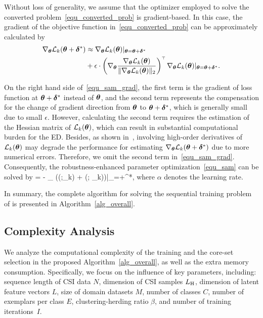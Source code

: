 Without loss of generality, we assume that the optimizer employed to solve the converted problem~\eqref{equ_converted_prob} is gradient-based.
In this case, the gradient of the objective function in~\eqref{equ_converted_prob} can be approximately calculated by
\begin{align}
    \label{equ_sam_grad}
    \nabla_{\bm\theta} \mathcal{L}_k(\bm\theta+\bm\delta^*) &\approx  \nabla_{\bm\theta} \mathcal{L}_k(\bm\theta)|_{\bm\theta = \bm\theta+\bm\delta^*}\\ 
    & + \epsilon \cdot \left( \nabla_{\bm\theta}\frac{ \nabla_{\bm\theta} \mathcal{L}_k(\bm\theta) }{\|\nabla_{\bm\theta} \mathcal{L}_k(\bm\theta)\|_2}\right)^{\scriptscriptstyle\top}\nabla_{\bm\theta} \mathcal{L}_k(\bm\theta)|_{\bm\theta = \bm\theta+\bm\delta^*}. \nonumber 
\end{align}

On the right hand side of~\eqref{equ_sam_grad}, the first term is the gradient of loss function at $\bm\theta+\bm\delta^*$ instead of $\bm\theta$, and the second term represents the compensation for the change of gradient direction from $\bm\theta$ to $\bm\theta+\bm\delta^*$, which is generally small due to small $\epsilon$. 
However, calculating the second term requires the estimation of the Hessian matrix of $\mathcal{L}_k(\bm\theta)$, which can result in substantial computational burden for the ED.
Besides, as shown in~\cite{Foret20ICLR_Sharpness}, involving high-order derivatives of $\mathcal{L}_k(\bm\theta)$ may degrade the performance for estimating $\nabla_{\bm\theta} \mathcal{L}_k(\bm\theta+\bm\delta^*)$ due to more numerical errors.
Therefore, we omit the second term in~\eqref{equ_sam_grad}.
Consequently, the robustness-enhanced parameter optimization~\eqref{equ_sam} can be solved by
\beq
\label{equ_param_update}
\btheta = \btheta - \alpha \nabla_{\btheta} (\cC(\btheta;\cD_k) + \cR(\btheta; \cK_k))|_{\btheta=\btheta+\bdelta^*},
\eeq
where $\alpha$ denotes the learning rate.

In summary, the complete algorithm for solving the sequential training problem of \name is presented in Algorithm~\ref{alg_overall}.




\subsection{Complexity Analysis}\label{s2ec_complex_ana}
We analyze the computational complexity of the training and the core-set selection in the proposed Algorithm~\ref{alg_overall}, as well as the extra memory consumption.
Specifically, we focus on the influence of key parameters, including: sequence length of CSI data $N$, dimension of CSI samples $L_{\mathrm{H}}$, dimension of latent feature vectors $L$, size of domain datasets $M$, number of classes $C$, number of exemplars per class $E$, clustering-herding ratio $\beta$, and number of training iterations~$I$.


